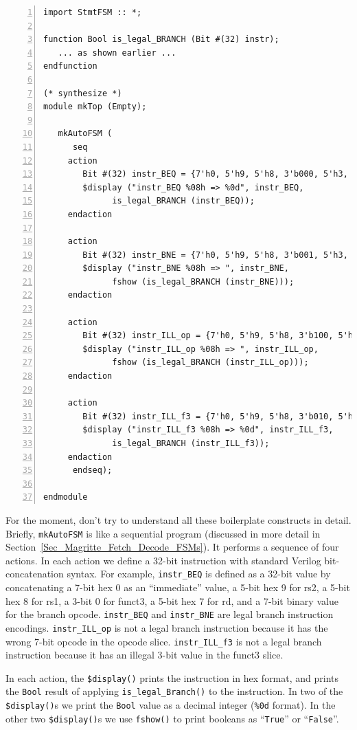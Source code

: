 \begin{minipage}{6.5in}\small
\begin{Verbatim}[frame=single, numbers=left]
import StmtFSM :: *;

function Bool is_legal_BRANCH (Bit #(32) instr);
   ... as shown earlier ...
endfunction

(* synthesize *)
module mkTop (Empty);

   mkAutoFSM (
      seq
	 action
	    Bit #(32) instr_BEQ = {7'h0, 5'h9, 5'h8, 3'b000, 5'h3, 7'b_110_0011};
	    $display ("instr_BEQ %08h => %0d", instr_BEQ,
		      is_legal_BRANCH (instr_BEQ));
	 endaction

	 action
	    Bit #(32) instr_BNE = {7'h0, 5'h9, 5'h8, 3'b001, 5'h3, 7'b_110_0011};
	    $display ("instr_BNE %08h => ", instr_BNE,
		      fshow (is_legal_BRANCH (instr_BNE)));
	 endaction

	 action
	    Bit #(32) instr_ILL_op = {7'h0, 5'h9, 5'h8, 3'b100, 5'h3, 7'b_110_0000};
	    $display ("instr_ILL_op %08h => ", instr_ILL_op,
		      fshow (is_legal_BRANCH (instr_ILL_op)));
	 endaction

	 action
	    Bit #(32) instr_ILL_f3 = {7'h0, 5'h9, 5'h8, 3'b010, 5'h3, 7'b_110_0011};
	    $display ("instr_ILL_f3 %08h => %0d", instr_ILL_f3,
		      is_legal_BRANCH (instr_ILL_f3));
	 endaction
      endseq);

endmodule
\end{Verbatim}
\end{minipage}

For the moment, don't try to understand all these boilerplate
constructs in detail.  Briefly, \verb|mkAutoFSM| is like a sequential
program (discussed in more detail in
Section~\ref{Sec_Magritte_Fetch_Decode_FSMs}).  It performs a sequence
of four actions.  In each action we define a 32-bit instruction with
standard Verilog bit-concatenation syntax.  For example,
\verb|instr_BEQ| is defined as a 32-bit value by concatenating a 7-bit
hex 0 as an ``immediate'' value, a 5-bit hex 9 for rs2, a 5-bit hex 8
for rs1, a 3-bit 0 for funct3, a 5-bit hex 7 for rd, and a 7-bit
binary value for the branch opcode.  \verb|instr_BEQ| and
\verb|instr_BNE| are legal branch instruction encodings.
\verb|instr_ILL_op| is not a legal branch instruction because it has
the wrong 7-bit opcode in the opcode slice.  \verb|instr_ILL_f3| is
not a legal branch instruction because it has an illegal 3-bit value
in the funct3 slice.

In each action, the \verb|$display()| prints the instruction in hex
format, and prints the \verb|Bool| result of applying
\verb|is_legal_Branch()| to the instruction.  In two of the
\verb|$display()|s we print the \verb|Bool| value as a decimal integer
(\verb|%0d| format).  In the other two \verb|$display()|s we use
\verb|fshow()| to print booleans as ``\verb|True|'' or
``\verb|False|''.

